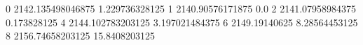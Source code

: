 0 2142.135498046875 1.229736328125
1 2140.90576171875 0.0
2 2141.07958984375 0.173828125
4 2144.102783203125 3.197021484375
6 2149.19140625 8.28564453125
8 2156.74658203125 15.8408203125
